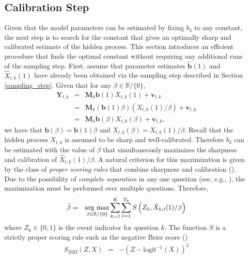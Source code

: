 \documentclass[aoas, preprint]{imsart}
\newcommand{\argmax}{\operatornamewithlimits{arg\ max}}
\numberwithin{equation}{section}
\theoremstyle{plain}
\newcommand{\R}{\mathbb{R}}
\newcommand{\logit}{\text{logit}}
\begin{document}
\subsection{Calibration Step}
\label{calibration_step}
Given that the model parameters can be estimated by fixing $b_3$ to any constant, the next step is to search for the constant that gives an optimally sharp and calibrated estimate of the hidden process.  This section introduces an efficient procedure that finds the optimal constant without requiring any additional runs of the sampling step. First, assume that parameter estimates  $\hat{\boldsymbol{b}}(1)$ and $\hat{X}_{t, k}(1)$ have already been obtained via the sampling step described in Section \ref{sampling_step}. Given that for any $\beta \in \R / \{0\}$,
\begin{eqnarray*}
\boldsymbol{Y}_{t, k} &=&  \boldsymbol{M}_k \boldsymbol{b} (1) X_{t, k}(1)+ \boldsymbol{v}_{t, k}\\
 &=&   \boldsymbol{M}_k \left(\boldsymbol{b} (1) \beta \right) \left(X_{t, k}(1)/\beta\right)  + \boldsymbol{v}_{t, k}\\
&=&   \boldsymbol{M}_k \boldsymbol{b} (\beta) X_{t, k}(\beta) + \boldsymbol{v}_{t, k},
\end{eqnarray*}
we have that  $\boldsymbol{b} (\beta) = \boldsymbol{b} (1) \beta $ and $X_{t, k}(\beta) = X_{t, k}(1)/\beta$. 
Recall that the hidden process $X_{t, k}$ is assumed to be sharp and well-calibrated. Therefore $b_3$ can be estimated with the value of $\beta$ that simultaneously maximizes the sharpness and calibration of $\hat{X}_{t, k}(1) / \beta$. A natural criterion for this maximization is given by the class of \textit{proper scoring rules} that combine sharpness and calibration (\citet{gneiting2008rejoinder, buja2005loss}). Due to the possibility of \textit{complete separation} in any one question (see, e.g., \citet{gelman2008weakly}), the maximization must be performed over multiple questions. Therefore,
\begin{eqnarray}
 \hat{\beta}&=&  \argmax_{\beta \in \R / \{0\}} \sum_{k=1}^K \sum_{t=1}^{T_k}  S\left(Z_k, \hat{X}_{k,t}(1) / \beta \right) \label{OSE}
\end{eqnarray}
where $Z_k \in \{0, 1\}$ is the event indicator for question $k$. The function $S$ is a strictly proper scoring rule such as the negative Brier score (\citet{Brier})
\begin{eqnarray*}
S_{BRI}(Z, X) &=& -(Z - \logit^{-1}(X))^2
\end{eqnarray*}
\end{document}
